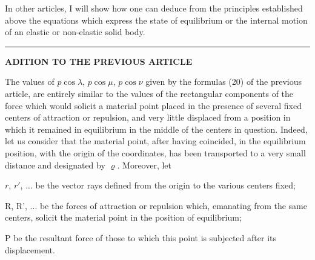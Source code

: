 \documentclass[leqno,openright,smallroyalvopaper,8pt,twoside,showtrims]{memoir}
\begin{document}
\vspace*{.5cm}
In other articles, I will show how one can deduce from the principles established above the equations which express the state of equilibrium or the internal motion of an elastic or non-elastic solid body.

\vspace*{.5cm}
\noindent 
\begin{center}
 \quad{}\quad{}\vspace*{.5cm}
 \end{center}

\noindent\rule{\textwidth}{0.5pt}\vspace*{-\baselineskip}\vspace*{2pt} 

\setcounter{equation}{0}
\vspace*{1cm}
\begin{center}
{\LARGE \textbf{ADITION TO THE PREVIOUS ARTICLE}}\vspace*{3pt} 
\end{center}

The values of $p\cos\lambda$, $p\cos\mu$, $p\cos\nu$ given by the formulas (20) of the previous article, are entirely similar to the values of the rectangular components of the force which would solicit a material point placed in the presence of several fixed centers of attraction or repulsion, and very little displaced from a position in which it remained in equilibrium in the middle of the centers in question. Indeed, let us consider that the material point, after having coincided, in the equilibrium position, with the origin of the coordinates, has been transported to a very small distance and designated by $\varrho$. Moreover, let

\noindent $r$, $r'$, ... be the vector rays defined from the origin to the various centers fixed;

\noindent R, R', ... be the forces of attraction or repulsion which, emanating from the same centers, solicit the material point in the position of equilibrium;

\noindent P be the resultant force of those to which this point is subjected after its displacement.
\end{document}
